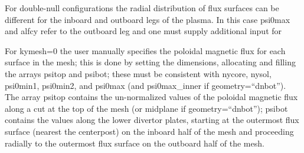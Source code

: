 \documentclass [12pt]{article}
\def\hsa{\hskip.4truein}
\begin{document}
For double-null configurations the radial distribution of flux
surfaces can be different for the inboard and outboard legs of the
plasma. In this case {\sf psi0max} and {\sf alfcy} refer to the outboard leg and
one must supply additional input for
{\sf
{}
} 

For {\sf kymesh}=0 the user manually specifies the poloidal magnetic flux for each
surface in the mesh; this is done by setting the dimensions,
allocating and filling the arrays {\sf psitop} and {\sf psibot}; these must be
consistent with {\sf nycore, nysol, psi0min1, psi0min2,} and {\sf psi0max} (and
{\sf psi0max\_inner} if {\sf geometry=``dnbot''}).  The array {\sf psitop} contains the
un-normalized values of the poloidal magnetic flux along a cut at the
top of the mesh (or midplane if {\sf geometry=``dnbot''}); {\sf psibot} contains the
values along the lower divertor plates, starting at the outermost flux
surface (nearest the centerpost) on the inboard half of the mesh and
proceeding radially to the outermost flux surface on the outboard half
of the mesh.
\end{document}

